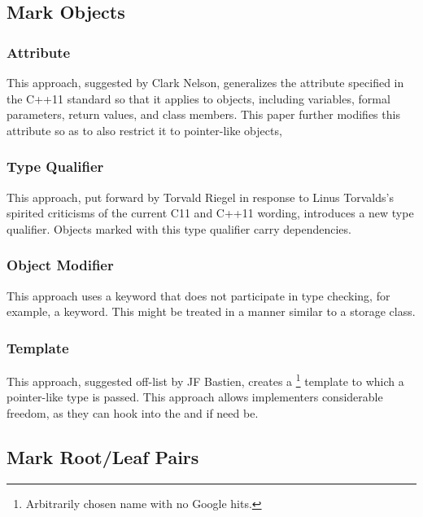 \documentclass[letterpaper,twocolumn,10pt]{article}
\begin{document}
\subsection{Mark Objects}
\label{sec:Mark Objects}

\subsubsection{Attribute}
\label{sec:Attribute}

This approach, suggested by Clark Nelson, generalizes the
 attribute specified in the C++11 standard
so that it applies to objects, including variables, formal parameters,
return values, and class members.
This paper further modifies this attribute so as to also restrict
it to pointer-like objects,

\subsubsection{Type Qualifier}
\label{sec:Type Qualifier}

This approach, put forward by Torvald Riegel in response to
Linus Torvalds's spirited criticisms of the current C11 and C++11
wording, introduces a new  type qualifier.
Objects marked with this type qualifier carry dependencies.

\subsubsection{Object Modifier}
\label{sec:Object Modifier}

This approach uses a keyword that does not participate in type checking,
for example, a  keyword.
This might be treated in a manner similar to a storage class.

\subsubsection{Template}
\label{sec:Template}

This approach, suggested off-list by JF Bastien, creates a
\footnote{
	Arbitrarily chosen name with no Google hits.}
template to which a pointer-like type is passed.
This approach allows implementers considerable freedom, as they can
hook into the \co{->} and \co{*} if need be.

\subsection{Mark Root/Leaf Pairs}
\label{sec:Mark Root/Leaf Pairs}
\end{document}
